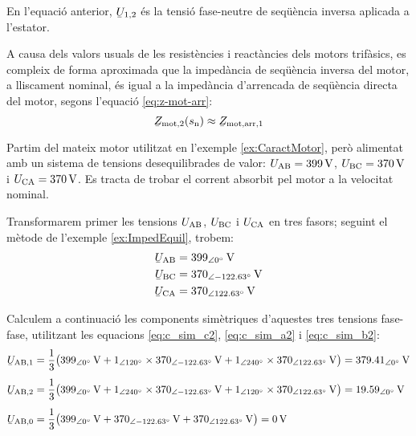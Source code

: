 En l'equació anterior, $\cmplx{U}_{1,2}$ és la tensió  fase-neutre de seqüència inversa aplicada a l’estator.

A causa dels valors usuals de les resistències i reactàncies dels motors trifàsics, es compleix de forma aproximada que la impedància de seqüència inversa del motor, a lliscament nominal,  és igual a la impedància d'arrencada de seqüència directa del motor, segons l'equació \eqref{eq:z-mot-arr}:
\begin{equation}
	\cmplx{Z}\ped{mot,2}(s\ped{n}) \approx \cmplx{Z}\ped{mot,arr,1}\label{eq:Zarr-aprox-Z2}
\end{equation}



\begin{exemple}\label{ex:TensDeseqMotor}
	\addcontentsxms{\TensDeseqMotor}
	Partim del mateix motor utilitzat en l'exemple \vref{ex:CaractMotor}, però alimentat amb un sistema de tensions desequilibrades de valor: $U_\mathrm{AB} =
	\qty{399}{V}$, $U_\mathrm{BC} = \qty{370}{V}$ i
	$U_\mathrm{CA} = \qty{370}{V}$. Es tracta de trobar el corrent absorbit pel motor a la velocitat nominal.
	
	Transformarem primer les tensions $U_\mathrm{AB}$, $U_\mathrm{BC}$ i $U_\mathrm{CA}$ en tres fasors; seguint el mètode de l'exemple \vref{ex:ImpedEquil}, trobem:
	\begin{align*}
		\cmplx{U}\ped{AB} &= \qtypd{399}{0}{V} \\
		\cmplx{U}\ped{BC} &= \qtypd{370}{-122,63}{V} \\
		\cmplx{U}\ped{CA} &= \qtypd{370}{122,63}{V}
	\end{align*}
	
	Calculem a continuació les components simètriques d'aquestes tres tensions fase-fase, utilitzant les equacions
	\eqref{eq:c_sim_c2}, \eqref{eq:c_sim_a2} i \eqref{eq:c_sim_b2}:
	\begin{align*}
	\cmplx{U}\ped{AB,1} &= \frac{1}{3} \big(
	\qtypd{399}{0}{V} + \numpd{1}{120} \times \qtypd{370}{-122,63}{V} +
	\numpd{1}{240} \times \qtypd{370}{122,63}{V}\big) = \qtypd{379,41}{0}{V} \\[1ex]
	\cmplx{U}\ped{AB,2} &= \frac{1}{3} \big(
	\qtypd{399}{0}{V} + \numpd{1}{240} \times \qtypd{370}{-122,63}{V} +
	\numpd{1}{120} \times \qtypd{370}{122,63}{V} \big) = \qtypd{19,59}{0}{V} \\[1ex]
	\cmplx{U}\ped{AB,0} &= \frac{1}{3} \big(
	\qtypd{399}{0}{V} + \qtypd{370}{-122,63}{V} + \qtypd{370}{122,63}{V}\big) = \qty{0}{V}
	\end{align*}
	

\end{exemple}
